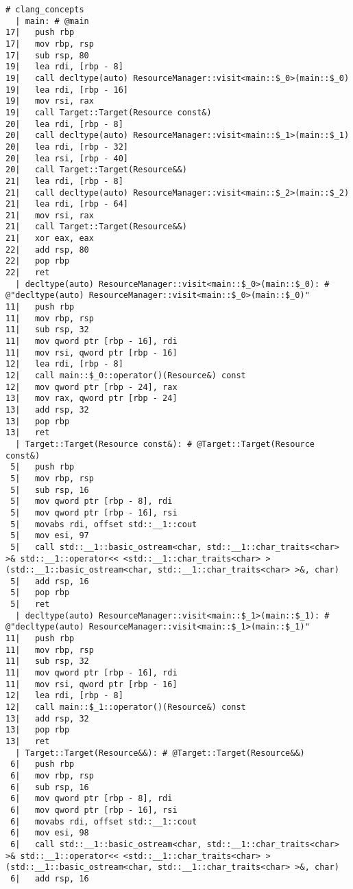 \begin{lstlisting}[language={},numbers=none,title=\href{https://godbolt.org/z/hwKje8}{\texttt{godbolt.org/z/hwKje8}}]
# clang_concepts 
  | main: # @main
17|   push rbp
17|   mov rbp, rsp
17|   sub rsp, 80
19|   lea rdi, [rbp - 8]
19|   call decltype(auto) ResourceManager::visit<main::$_0>(main::$_0)
19|   lea rdi, [rbp - 16]
19|   mov rsi, rax
19|   call Target::Target(Resource const&)
20|   lea rdi, [rbp - 8]
20|   call decltype(auto) ResourceManager::visit<main::$_1>(main::$_1)
20|   lea rdi, [rbp - 32]
20|   lea rsi, [rbp - 40]
20|   call Target::Target(Resource&&)
21|   lea rdi, [rbp - 8]
21|   call decltype(auto) ResourceManager::visit<main::$_2>(main::$_2)
21|   lea rdi, [rbp - 64]
21|   mov rsi, rax
21|   call Target::Target(Resource&&)
21|   xor eax, eax
22|   add rsp, 80
22|   pop rbp
22|   ret
  | decltype(auto) ResourceManager::visit<main::$_0>(main::$_0): # @"decltype(auto) ResourceManager::visit<main::$_0>(main::$_0)"
11|   push rbp
11|   mov rbp, rsp
11|   sub rsp, 32
11|   mov qword ptr [rbp - 16], rdi
11|   mov rsi, qword ptr [rbp - 16]
12|   lea rdi, [rbp - 8]
12|   call main::$_0::operator()(Resource&) const
12|   mov qword ptr [rbp - 24], rax
13|   mov rax, qword ptr [rbp - 24]
13|   add rsp, 32
13|   pop rbp
13|   ret
  | Target::Target(Resource const&): # @Target::Target(Resource const&)
 5|   push rbp
 5|   mov rbp, rsp
 5|   sub rsp, 16
 5|   mov qword ptr [rbp - 8], rdi
 5|   mov qword ptr [rbp - 16], rsi
 5|   movabs rdi, offset std::__1::cout
 5|   mov esi, 97
 5|   call std::__1::basic_ostream<char, std::__1::char_traits<char> >& std::__1::operator<< <std::__1::char_traits<char> >(std::__1::basic_ostream<char, std::__1::char_traits<char> >&, char)
 5|   add rsp, 16
 5|   pop rbp
 5|   ret
  | decltype(auto) ResourceManager::visit<main::$_1>(main::$_1): # @"decltype(auto) ResourceManager::visit<main::$_1>(main::$_1)"
11|   push rbp
11|   mov rbp, rsp
11|   sub rsp, 32
11|   mov qword ptr [rbp - 16], rdi
11|   mov rsi, qword ptr [rbp - 16]
12|   lea rdi, [rbp - 8]
12|   call main::$_1::operator()(Resource&) const
13|   add rsp, 32
13|   pop rbp
13|   ret
  | Target::Target(Resource&&): # @Target::Target(Resource&&)
 6|   push rbp
 6|   mov rbp, rsp
 6|   sub rsp, 16
 6|   mov qword ptr [rbp - 8], rdi
 6|   mov qword ptr [rbp - 16], rsi
 6|   movabs rdi, offset std::__1::cout
 6|   mov esi, 98
 6|   call std::__1::basic_ostream<char, std::__1::char_traits<char> >& std::__1::operator<< <std::__1::char_traits<char> >(std::__1::basic_ostream<char, std::__1::char_traits<char> >&, char)
 6|   add rsp, 16

\end{lstlisting}
